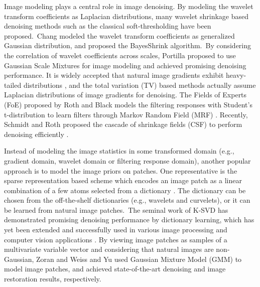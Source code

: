 Image modeling plays a central role in image denoising. By modeling the wavelet transform coefficients as Laplacian distributions, many wavelet shrinkage based denoising methods such as the classical soft-thresholding \cite{softthresholding} have been proposed.\ Chang \etal modeled the wavelet transform coefficients as generalized Gaussian distribution, and proposed the BayesShrink \cite{bayesshrink} algorithm.\ By considering the correlation of wavelet coefficients across scales, Portilla \etal  \cite{blsgsm} proposed to use Gaussian Scale Mixtures for image modeling and achieved promising denoising performance. It is widely accepted that natural image gradients exhibit heavy-tailed distributions \cite{weiss}, and the total variation (TV) based methods \cite{rudin1992nonlinear,osher2005iterative} actually assume Laplacian distributions of image gradients for denoising. The Fields of Experts (FoE) \cite{foe} proposed by Roth and Black models the filtering responses with Student's t-distribution to learn filters through Markov Random Field (MRF) \cite{Bishop}. Recently, Schmidt and Roth proposed the cascade of shrinkage fields (CSF) to perform denoising efficiently \cite{csf}.

Instead of modeling the image statistics in some transformed domain (e.g., gradient domain, wavelet domain or filtering response domain), another popular approach is to model the image priors on patches. One representative is the sparse representation based scheme which encodes an image patch as a linear combination of a few atoms selected from a dictionary \cite{olshausen1996emergence,olshausen1997sparse,ksvd}. The dictionary can be chosen from the off-the-shelf dictionaries (e.g., wavelets and curvelets), or it can be learned from natural image patches.\ The seminal work of K-SVD \cite{ksvdtsp,ksvd} has demonstrated promising denoising performance by dictionary learning, which has yet been extended and successfully used in various image processing and computer vision applications \cite{srcolor,srcvpr,lcksvd}. By viewing image patches as samples of a multivariate variable vector and considering that natural images are non-Gaussian, Zoran and Weiss \cite{epll,gmmnips} and Yu \etal  \cite{ple} used Gaussian Mixture Model (GMM) to model image patches, and achieved state-of-the-art denoising and image restoration results, respectively.

